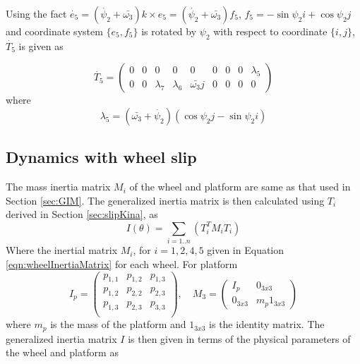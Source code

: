 Using the fact $\dot{e_5}=(\dot{\psi_2}+\bar{\omega_3})k\times e_5 =(\dot{\psi_2}+\bar{\omega_3})f_5$,  $f_5=-\sin \psi_2 i+\cos \psi_2 j$ and coordinate system $\{e_5,f_5\}$ is rotated by $\psi_2$ with respect to coordinate $ \{i,j\}$, $\dot{T_5}$ is given as

\begin{equation}
\label{eqn:slip_dT5}
\dot{T_5}=
\begin{pmatrix}
0 & 0 & 0 & 0 & 0 & 0 & 0 & 0 & \lambda_5\\
0 & 0 & \lambda_7 & \lambda_6 & \bar{\omega_3}j & 0 & 0 & 0 & 0
\end{pmatrix}
\end{equation}
where 
\[ \lambda_5 = (\bar{\omega_3}+\dot{\psi_2}) (\cos\psi_2 j-\sin \psi_2 i) \]
\subsection{Dynamics  with wheel slip}
\label{sec:slipDynamics}
The mass inertia matrix $M_i$ of the wheel and platform are same as that used in Section \ref{sec:GIM}. The generalized inertia matrix is then calculated using $T_i$ derived in Section  \ref{sec:slipKina}, as
\begin{equation}
I(\theta)=\sum_{i=1..n}(T_i^TM_iT_i)
\end{equation}
Where the inertial matrix $M_i$, for $ i=1,2,4,5$ given in Equation \ref{eqn:wheelInertiaMatrix} for each wheel. For platform  \[ I_p=\begin{pmatrix}
 p_{1,1} & p_{1,2} & p_{1,3}\\   
 p_{1,2} & p_{2,2} & p_{2,3}\\   
 p_{1,3} & p_{2,3} & p_{3,3}\\   
\end{pmatrix},  \quad  M_3=\begin{pmatrix}
 I_p & 0_{3x3}\\
 0_{3x3} & m_p 1_{3x3}
\end{pmatrix}\]
where $m_p$ is the mass of the platform and $1_{3x3}$ is the identity matrix.
The generalized inertia matrix $I$ is then given in terms of the  physical parameters of the wheel and platform as 
